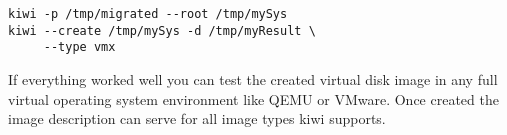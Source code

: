 \begin{Command}{12cm}
\begin{verbatim}
kiwi -p /tmp/migrated --root /tmp/mySys
kiwi --create /tmp/mySys -d /tmp/myResult \
     --type vmx
\end{verbatim}
\end{Command}

If everything worked well you can test the created virtual disk
image in any full virtual operating system environment like QEMU or
VMware. Once created the image description can serve for all image
types kiwi supports.
 
